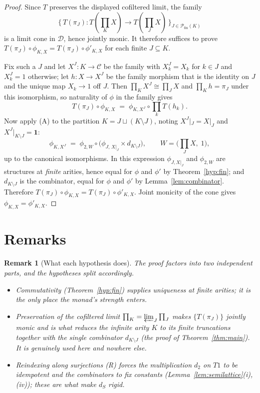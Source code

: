 \documentclass{article}
\newtheorem{remark}{Remark}
\newcommand{\C}{\mathcal{C}}
\newcommand{\D}{\mathcal{D}}
\begin{document}
\begin{proof}
Since $T$ preserves the displayed cofiltered limit, the family
\[
  \bigl\{\,T(\pi_J)\colon T(\textstyle\prod_K X)\to T(\textstyle\prod_J X)\,\bigr\}_{J\in\mathcal P_{\mathrm{fin}}(K)}
\]
is a limit cone in $\D$, hence jointly monic. It therefore suffices to prove
$T(\pi_J)\circ\phi_{K,X}=T(\pi_J)\circ\phi'_{K,X}$ for each finite $J\subseteq
K$.

Fix such a $J$ and let $X^{J}\colon K\to\C$ be the family with $X^{J}_k=X_k$ for
$k\in J$ and $X^{J}_k=1$ otherwise; let $h\colon X\to X^{J}$ be the family
morphism that is the identity on $J$ and the unique map $X_k\to1$ off $J$. Then
$\prod_K X^{J}\cong\prod_J X$ and $\prod_K h=\pi_J$ under this isomorphism, so
naturality of $\phi$ in the family gives
\[
  T(\pi_J)\circ\phi_{K,X}
  \;=\;
  \phi_{K,X^{J}}\circ\prod_{k}T(h_k).
\]
Now apply (A) to the partition $K=J\sqcup(K\setminus J)$, noting
$X^{J}|_{J}=X|_J$ and $X^{J}|_{K\setminus J}=\mathbf 1$:
\[
  \phi_{K,X^{J}}
  \;=\;
  \phi_{2,W}\circ\bigl(\phi_{J,\,X|_J}\times d_{K\setminus J}\bigr),
  \qquad W=\bigl(\textstyle\prod_J X,\;1\bigr),
\]
up to the canonical isomorphisms. In this expression $\phi_{J,X|_J}$ and
$\phi_{2,W}$ are structures at \emph{finite} arities, hence equal for $\phi$ and
$\phi'$ by Theorem~\ref{hyp:fin}; and $d_{K\setminus J}$ is the combinator,
equal for $\phi$ and $\phi'$ by Lemma~\ref{lem:combinator}. Therefore
$T(\pi_J)\circ\phi_{K,X}=T(\pi_J)\circ\phi'_{K,X}$. Joint monicity of the cone
gives $\phi_{K,X}=\phi'_{K,X}$.
\end{proof}

\section{Remarks}

\begin{remark}[What each hypothesis does]
The proof factors into two independent parts, and the hypotheses split
accordingly.
\begin{itemize}
  \item \emph{Commutativity} (Theorem~\ref{hyp:fin}) supplies uniqueness at
  finite arities; it is the only place the monad's strength enters.
  \item \emph{Preservation of the cofiltered limit} $\prod_K=\varprojlim_J\prod_J$
  makes $\{T(\pi_J)\}$ jointly monic and is what reduces the infinite arity $K$
  to its finite truncations together with the single combinator
  $d_{K\setminus J}$ (the proof of Theorem~\ref{thm:main}). It is genuinely used
  here and nowhere else.
  \item \emph{Reindexing along surjections} (R) forces the multiplication
  $d_2$ on $T1$ to be idempotent and the combinators to fix constants
  (Lemma~\ref{lem:semilattice}(i),(iv)); these are what make $d_S$ rigid.
\end{itemize}
\end{remark}
\end{document}

